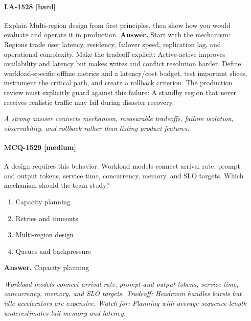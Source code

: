 \paragraph{LA-1528 [hard]} Explain Multi-region design from first principles, then show how you would evaluate and operate it in production.
\noindent\textbf{Answer.} Start with the mechanism: Regions trade user latency, residency, failover speed, replication lag, and operational complexity. Make the tradeoff explicit: Active-active improves availability and latency but makes writes and conflict resolution harder. Define workload-specific offline metrics and a latency/cost budget, test important slices, instrument the critical path, and create a rollback criterion. The production review must explicitly guard against this failure: A standby region that never receives realistic traffic may fail during disaster recovery.
\par\textit{A strong answer connects mechanism, measurable tradeoffs, failure isolation, observability, and rollback rather than listing product features.}
\paragraph{MCQ-1529 [medium]} A design requires this behavior: Workload models connect arrival rate, prompt and output tokens, service time, concurrency, memory, and SLO targets. Which mechanism should the team study?
\begin{enumerate}[label=\Alph*.]
\item Capacity planning
\item Retries and timeouts
\item Multi-region design
\item Queues and backpressure
\end{enumerate}
\noindent\textbf{Answer.} Capacity planning
\par\textit{Workload models connect arrival rate, prompt and output tokens, service time, concurrency, memory, and SLO targets. Tradeoff: Headroom handles bursts but idle accelerators are expensive. Watch for: Planning with average sequence length underestimates tail memory and latency.}

